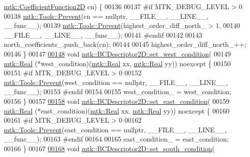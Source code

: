 \begin{DoxyCode}
      \hyperlink{group__c07-mim__ops_gad9e1c0ace886b0029aefffa5f320e852}{mtk::CoefficientFunction2D} cn) \{
00136 
00137 \textcolor{preprocessor}{  #if MTK\_DEBUG\_LEVEL > 0}
00138   \hyperlink{classmtk_1_1Tools_a332324c6f25e66be9dff48c5987a3b9f}{mtk::Tools::Prevent}(cn == \textcolor{keyword}{nullptr}, \_\_FILE\_\_, \_\_LINE\_\_, \_\_func\_\_);
00139   \hyperlink{classmtk_1_1Tools_a332324c6f25e66be9dff48c5987a3b9f}{mtk::Tools::Prevent}(highest\_order\_diff\_north\_ > 1,
00140                       \_\_FILE\_\_, \_\_LINE\_\_, \_\_func\_\_);
00141 \textcolor{preprocessor}{  #endif}
00142 
00143   north\_coefficients\_.push\_back(cn);
00144 
00145   highest\_order\_diff\_north\_++;
00146 \}
00147 
\hypertarget{mtk__bc__descriptor__2d_8cc_source_l00148}{}\hyperlink{classmtk_1_1BCDescriptor2D_a006050efe15b1be75b36a74a23051392}{00148} \textcolor{keywordtype}{void} \hyperlink{classmtk_1_1BCDescriptor2D_a006050efe15b1be75b36a74a23051392}{mtk::BCDescriptor2D::set\_west\_condition}(
00149     \hyperlink{group__c01-roots_gac080bbbf5cbb5502c9f00405f894857d}{mtk::Real} (*west\_condition)(\hyperlink{group__c01-roots_gac080bbbf5cbb5502c9f00405f894857d}{mtk::Real} xx, \hyperlink{group__c01-roots_gac080bbbf5cbb5502c9f00405f894857d}{mtk::Real} yy)) noexcept \{
00150 
00151 \textcolor{preprocessor}{  #if MTK\_DEBUG\_LEVEL > 0}
00152   \hyperlink{classmtk_1_1Tools_a332324c6f25e66be9dff48c5987a3b9f}{mtk::Tools::Prevent}(west\_condition == \textcolor{keyword}{nullptr}, \_\_FILE\_\_, \_\_LINE\_\_, \_\_func\_\_);
00153 \textcolor{preprocessor}{  #endif}
00154 
00155   west\_condition\_ = west\_condition;
00156 \}
00157 
\hypertarget{mtk__bc__descriptor__2d_8cc_source_l00158}{}\hyperlink{classmtk_1_1BCDescriptor2D_a4ba8690e845f59a1507b056f3fc8061e}{00158} \textcolor{keywordtype}{void} \hyperlink{classmtk_1_1BCDescriptor2D_a4ba8690e845f59a1507b056f3fc8061e}{mtk::BCDescriptor2D::set\_east\_condition}(
00159     \hyperlink{group__c01-roots_gac080bbbf5cbb5502c9f00405f894857d}{mtk::Real} (*east\_condition)(\hyperlink{group__c01-roots_gac080bbbf5cbb5502c9f00405f894857d}{mtk::Real} xx, \hyperlink{group__c01-roots_gac080bbbf5cbb5502c9f00405f894857d}{mtk::Real} yy)) noexcept \{
00160 
00161 \textcolor{preprocessor}{  #if MTK\_DEBUG\_LEVEL > 0}
00162   \hyperlink{classmtk_1_1Tools_a332324c6f25e66be9dff48c5987a3b9f}{mtk::Tools::Prevent}(east\_condition == \textcolor{keyword}{nullptr}, \_\_FILE\_\_, \_\_LINE\_\_, \_\_func\_\_);
00163 \textcolor{preprocessor}{  #endif}
00164 
00165   east\_condition\_ = east\_condition;
00166 \}
00167 
\hypertarget{mtk__bc__descriptor__2d_8cc_source_l00168}{}\hyperlink{classmtk_1_1BCDescriptor2D_a408f159cc44d7ee610191efb8ed48b2a}{00168} \textcolor{keywordtype}{void} \hyperlink{classmtk_1_1BCDescriptor2D_a408f159cc44d7ee610191efb8ed48b2a}{mtk::BCDescriptor2D::set\_south\_condition}(

\end{DoxyCode}
